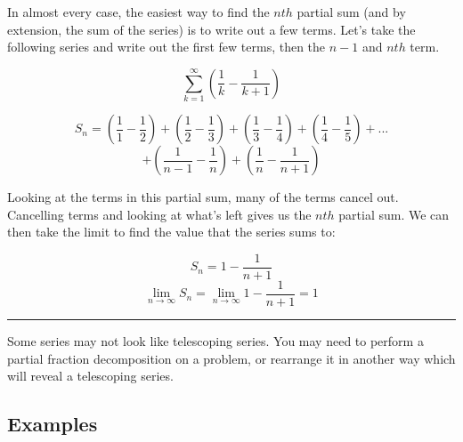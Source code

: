 \documentclass[12pt]{report}
\begin{document}
In almost every case, the easiest way to find the $nth$ partial sum (and by extension, the sum of the series) is to write out a few terms. Let's take the following series and write out the first few terms, then the $n-1$ and $nth$ term. 

    $$ \sum_{k=1}^{\infty} \left( \frac{1}{k} - \frac{1}{k+1} \right) $$

    $$
        S_n = \left( \frac{1}{1} - \frac{1}{2} \right) + \left( \frac{1}{2} - \frac{1}{3} \right) +  \left( \frac{1}{3} - \frac{1}{4} \right) +  \left( \frac{1}{4} - \frac{1}{5} \right) + ...
    $$
    $$
        +  \left( \frac{1}{n-1} - \frac{1}{n} \right) +  \left( \frac{1}{n} - \frac{1}{n+1} \right)
    $$

Looking at the terms in this partial sum, many of the terms cancel out. Cancelling terms and looking at what's left gives us the $nth$ partial sum. We can then take the limit to find the value that the series sums to:

    $$ S_n = 1 - \frac{1}{n+1} $$
    $$ \lim_{n\to\infty} S_n = \lim_{n\to\infty} 1 - \frac{1}{n+1} = 1 $$

\noindent\rule{2cm}{0.4pt}


Some series may not look like telescoping series. You may need to perform a partial fraction decomposition on a problem, or rearrange it in another way which will reveal a telescoping series.

\subsection*{Examples}
\end{document}
